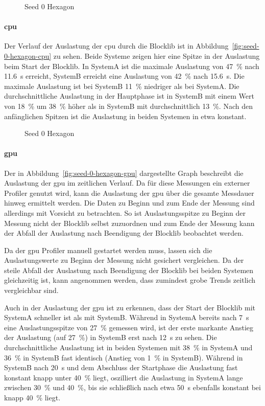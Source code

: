 \begin{figure}[!htbp]
	\caption{Seed 0 Hexagon}\label{fig:seed-0-hexagon-cpu}
\end{figure}
\paragraph{\ac{cpu}} Der Verlauf der Auslastung der \ac{cpu} durch die Blocklib ist in Abbildung~\vref{fig:seed-0-hexagon-cpu} zu sehen. Beide Systeme zeigen hier eine Spitze in der Auslastung beim Start der Blocklib. In SystemA ist die maximale Auslastung von \SI{47}{\percent} nach \SI{11,6}{\second} erreicht, SystemB erreicht eine Auslastung von \SI{42}{\percent} nach \SI{15,6}{\second}. Die maximale Auslastung ist bei SystemB \SI{11}{\percent} niedriger als bei SystemA. Die durchschnittliche Auslastung in der Hauptphase ist in SystemB mit einem Wert von \SI{18}{\percent} um \SI{38}{\percent} höher als in SystemB mit durchschnittlich \SI{13}{\percent}. Nach den anfänglichen Spitzen ist die Auslastung in beiden Systemen in etwa konstant.

\begin{figure}[!htbp]
	\caption{Seed 0 Hexagon}\label{fig:seed-0-hexagon-gpu}
\end{figure}
\paragraph{\ac{gpu}} Der in Abbildung~\vref{fig:seed-0-hexagon-gpu} dargestellte Graph beschreibt die Auslastung der \ac{gpu} im zeitlichen Verlauf. Da für diese Messungen ein externer Profiler genutzt wird, kann die Auslastung der \ac{gpu} über die gesamte Messdauer hinweg ermittelt werden. Die Daten zu Beginn und zum Ende der Messung sind allerdings mit Vorsicht zu betrachten. So ist Auslastungsspitze zu Beginn der Messung nicht der Blocklib selbst zuzuordnen und zum Ende der Messung kann der Abfall der Auslastung nach Beendigung der Blocklib beobachtet werden. 

Da der \ac{gpu} Profiler manuell gestartet werden muss, lassen sich die Auslastungswerte zu Beginn der Messung nicht gesichert vergleichen. Da der steile Abfall der Auslastung nach Beendigung der Blocklib bei beiden Systemen gleichzeitig ist, kann angenommen werden, dass zumindest grobe Trends zeitlich vergleichbar sind.

Auch in der Auslastung der \ac{gpu} ist zu erkennen, dass der Start der Blocklib mit SystemA schneller ist als mit SystemB. Während in SystemA bereits nach \SI{7}{\second} eine Auslastungsspitze von \SI{27}{\percent} gemessen wird, ist der erste markante Anstieg der Auslastung (auf \SI{27}{\percent}) in SystemB  erst nach \SI{12}{\second} zu sehen. Die durchschnittliche Auslastung ist in beiden Systemen mit \SI{38}{\percent} in SystemA und \SI{36}{\percent} in SystemB fast identisch (Anstieg von \SI{1}{\percent} in SystemB). Während in SystemB nach \SI{20}{\second} und dem Abschluss der Startphase die Auslastung fast konstant knapp unter \SI{40}{\percent} liegt, oszilliert die Auslastung in SystemA lange zwischen \SI{30}{\percent} und \SI{40}{\percent}, bis sie schließlich nach etwa \SI{50}{\second} ebenfalls konstant bei knapp \SI{40}{\percent} liegt.

